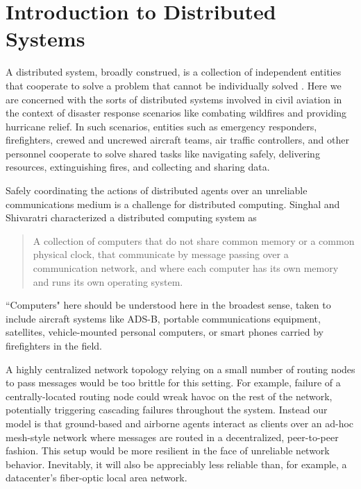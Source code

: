 \section{Introduction to Distributed Systems}

A distributed system, broadly construed, is a collection of
independent entities that cooperate to solve a problem that cannot be
individually solved \cite{kshemkalyani_singhal_2008}. Here we are
concerned with the sorts of distributed systems involved in civil
aviation in the context of disaster response scenarios like combating
wildfires and providing hurricane relief. In such scenarios, entities
such as emergency responders, firefighters, crewed and uncrewed
aircraft teams, air traffic controllers, and other personnel cooperate
to solve shared tasks like navigating safely, delivering resources,
extinguishing fires, and collecting and sharing data.

Safely coordinating the actions of distributed agents over an
unreliable communications medium is a challenge for distributed
computing. Singhal and Shivaratri \cite{10.5555/562065} characterized
a distributed computing system as
\begin{quotation}
  A collection of computers that do not share common memory or a
  common physical clock, that communicate by message passing over a
  communication network, and where each computer has its own memory
  and runs its own operating system.
\end{quotation}
``Computers" here should be understood here in the broadest sense,
taken to include aircraft systems like ADS-B, portable communications
equipment, satellites, vehicle-mounted personal computers, or smart
phones carried by firefighters in the field.

A highly centralized network topology relying on a small number of
routing nodes to pass messages would be too brittle for this
setting. For example, failure of a centrally-located routing node
could wreak havoc on the rest of the network, potentially triggering
cascading failures throughout the system. Instead our model is that
ground-based and airborne agents interact as clients over an ad-hoc
mesh-style network where messages are routed in a decentralized,
peer-to-peer fashion. This setup would be more resilient in the face
of unreliable network behavior.  Inevitably, it will also be
appreciably less reliable than, for example, a datacenter's
fiber-optic local area network.

